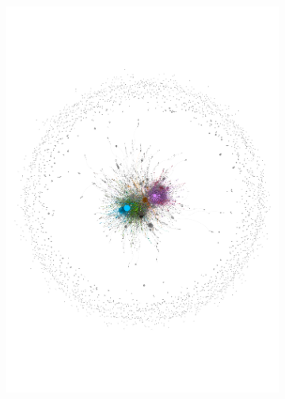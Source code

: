 \documentclass[
  a4paper,
  abstract=on,
  captions=tableabove
  ]{scrartcl}
\begin{document}
\begin{figure}
\begin{subfigure}{.45\linewidth}
          \label{subfig:net_diac_hyperlocal_two}
          \centering
          \includegraphics[width=\linewidth, height=\textheight, keepaspectratio]{img/net_hyperlocal_two.pdf}
        \end{subfigure}


\end{figure}
\end{document}
